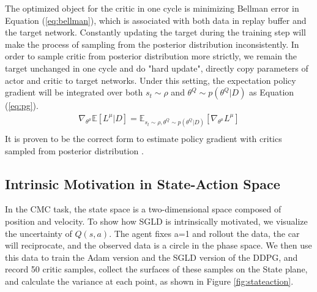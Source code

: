 The optimized object for the critic in one cycle is minimizing Bellman error in Equation (\ref{eq:bellman}), which is associated with both data in replay buffer and the target network. Constantly updating the target during the training step will make the process of sampling from the posterior distribution inconsistently. In order to sample critic from posterior distribution more strictly, we remain the target unchanged in one cycle and do "hard update", directly copy parameters of actor and critic to target networks. Under this setting, the expectation policy gradient will be integrated over both $s_t\sim\rho$ and $\theta^Q\sim p(\theta^Q|D)$ as Equation (\ref{eq:pg}). 
\begin{equation}
   \label{eq:pg} 
   \begin{aligned}
   \nabla_{\theta^\mu}\mathbb{E}[L^\mu|D] = \mathbb{E}_{s_t\sim\rho,\theta^Q\sim p(\theta^Q|D)}[\nabla_{\theta^\mu}L^\mu]\\
   \end{aligned}
\end{equation}
It is proven to be the correct form to estimate policy gradient with critics sampled from posterior distribution \cite{dropoutInference}.

\subsection{Intrinsic Motivation in State-Action Space}
In the CMC task, the state space is a two-dimensional space composed of position and velocity. To show how SGLD is intrinsically motivated, we visualize the uncertainty of $Q(s,a)$. The agent fixes a=1 and rollout the data, the car will reciprocate, and the observed data is a circle in the phase space. We then use this data to train the Adam version and the SGLD version of the DDPG, and record 50 critic samples, collect the surfaces of these samples on the State plane, and calculate the variance at each point, as shown in Figure \ref{fig:stateaction}.

